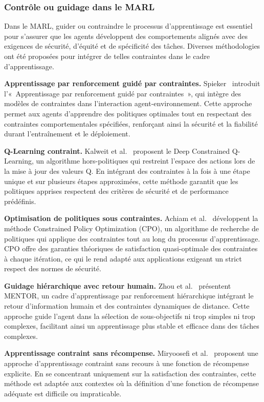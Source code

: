 \subsubsection{Contrôle ou guidage dans le MARL}\label{sub-sec:rel_control}

Dans le MARL, guider ou contraindre le processus d'apprentissage est essentiel pour s'assurer que les agents développent des comportements alignés avec des exigences de sécurité, d'équité et de spécificité des tâches. Diverses méthodologies ont été proposées pour intégrer de telles contraintes dans le cadre d'apprentissage.

\textbf{Apprentissage par renforcement guidé par contraintes.} Spieker~\cite{spieker2021constraint} introduit l'« Apprentissage par renforcement guidé par contraintes », qui intègre des modèles de contraintes dans l'interaction agent-environnement. Cette approche permet aux agents d'apprendre des politiques optimales tout en respectant des contraintes comportementales spécifiées, renforçant ainsi la sécurité et la fiabilité durant l'entraînement et le déploiement.

\textbf{Q-Learning contraint.} Kalweit et al.~\cite{kalweit2020deep} proposent le Deep Constrained Q-Learning, un algorithme hors-politiques qui restreint l'espace des actions lors de la mise à jour des valeurs Q. En intégrant des contraintes à la fois à une étape unique et sur plusieurs étapes approximées, cette méthode garantit que les politiques apprises respectent des critères de sécurité et de performance prédéfinis.

\textbf{Optimisation de politiques sous contraintes.} Achiam et al.~\cite{achiam2017constrained} développent la méthode Constrained Policy Optimization (CPO), un algorithme de recherche de politiques qui applique des contraintes tout au long du processus d'apprentissage. CPO offre des garanties théoriques de satisfaction quasi-optimale des contraintes à chaque itération, ce qui le rend adapté aux applications exigeant un strict respect des normes de sécurité.

\textbf{Guidage hiérarchique avec retour humain.} Zhou et al.~\cite{zhou2024mentor} présentent MENTOR, un cadre d'apprentissage par renforcement hiérarchique intégrant le retour d'information humain et des contraintes dynamiques de distance. Cette approche guide l'agent dans la sélection de sous-objectifs ni trop simples ni trop complexes, facilitant ainsi un apprentissage plus stable et efficace dans des tâches complexes.

\textbf{Apprentissage contraint sans récompense.} Miryoosefi et al.~\cite{miryoosefi2022simple} proposent une approche d'apprentissage contraint sans recours à une fonction de récompense explicite. En se concentrant uniquement sur la satisfaction des contraintes, cette méthode est adaptée aux contextes où la définition d'une fonction de récompense adéquate est difficile ou impraticable.

